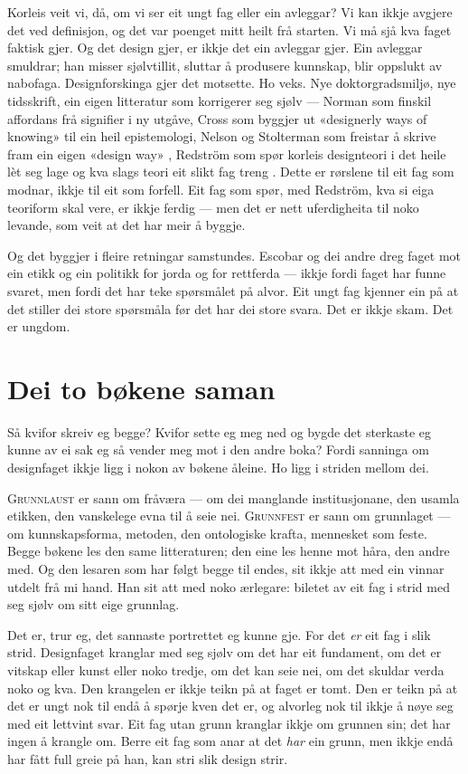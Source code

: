 Korleis veit vi, då, om vi ser eit ungt fag eller ein avleggar? Vi kan ikkje avgjere det ved definisjon, og det var poenget mitt heilt frå starten. Vi må sjå kva faget faktisk gjer. Og det design gjer, er ikkje det ein avleggar gjer. Ein avleggar smuldrar; han misser sjølvtillit, sluttar å produsere kunnskap, blir oppslukt av nabofaga. Designforskinga gjer det motsette. Ho veks. Nye doktorgradsmiljø, nye tidsskrift, ein eigen litteratur som korrigerer seg sjølv — Norman som finskil affordans frå signifier i ny utgåve, Cross som byggjer ut «designerly ways of knowing» til ein heil epistemologi, Nelson og Stolterman som freistar å skrive fram ein eigen «design way» \autocite{nelson2012designway}, Redström som spør korleis designteori i det heile lèt seg lage og kva slags teori eit slikt fag treng \autocite{redstrom2017making}. Dette er rørslene til eit fag som modnar, ikkje til eit som forfell. Eit fag som spør, med Redström, kva si eiga teoriform skal vere, er ikkje ferdig — men det er nett uferdigheita til noko levande, som veit at det har meir å byggje.

Og det byggjer i fleire retningar samstundes. Escobar og dei andre dreg faget mot ein etikk og ein politikk for jorda og for rettferda \autocite{escobar2018pluriverse} — ikkje fordi faget har funne svaret, men fordi det har teke spørsmålet på alvor. Eit ungt fag kjenner ein på at det stiller dei store spørsmåla før det har dei store svara. Det er ikkje skam. Det er ungdom.

\section{Dei to bøkene saman}

Så kvifor skreiv eg begge? Kvifor sette eg meg ned og bygde det sterkaste eg kunne av ei sak eg så vender meg mot i den andre boka? Fordi sanninga om designfaget ikkje ligg i nokon av bøkene åleine. Ho ligg i striden mellom dei.

\textsc{Grunnlaust} er sann om fråværa — om dei manglande institusjonane, den usamla etikken, den vanskelege evna til å seie nei. \textsc{Grunnfest} er sann om grunnlaget — om kunnskapsforma, metoden, den ontologiske krafta, mennesket som feste. Begge bøkene les den same litteraturen; den eine les henne mot håra, den andre med. Og den lesaren som har følgt begge til endes, sit ikkje att med ein vinnar utdelt frå mi hand. Han sit att med noko ærlegare: biletet av eit fag i strid med seg sjølv om sitt eige grunnlag.

Det er, trur eg, det sannaste portrettet eg kunne gje. For det \emph{er} eit fag i slik strid. Designfaget kranglar med seg sjølv om det har eit fundament, om det er vitskap eller kunst eller noko tredje, om det kan seie nei, om det skuldar verda noko og kva. Den krangelen er ikkje teikn på at faget er tomt. Den er teikn på at det er ungt nok til endå å spørje kven det er, og alvorleg nok til ikkje å nøye seg med eit lettvint svar. Eit fag utan grunn kranglar ikkje om grunnen sin; det har ingen å krangle om. Berre eit fag som anar at det \emph{har} ein grunn, men ikkje endå har fått full greie på han, kan stri slik design strir.

